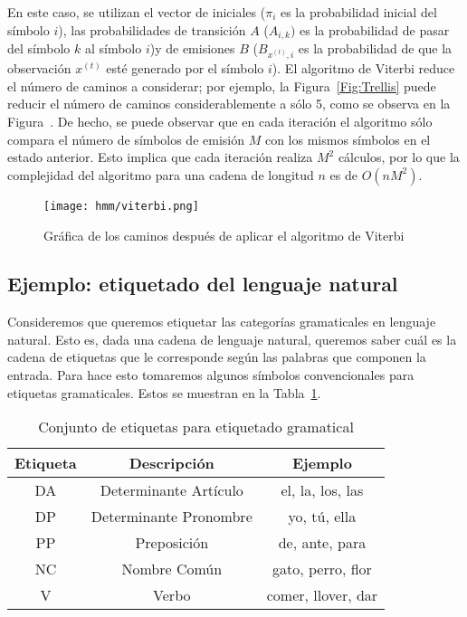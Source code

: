 En este caso, se utilizan el vector de iniciales ($\pi_i$ es la probabilidad inicial del símbolo $i$), las probabilidades de transición $A$ ($A_{i, k})$ es la probabilidad de pasar del símbolo $k$ al símbolo $i$)y de emisiones $B$ ($B_{ x^{(t)}, i}$ es la probabilidad de que la observación $x^{(t)}$ esté generado por el símbolo $i$). El algoritmo de Viterbi reduce el número de caminos a considerar; por ejemplo, la Figura~\ref{Fig:Trellis} puede reducir el número de caminos considerablemente a sólo 5, como se observa en la Figura~. De hecho, se puede observar que en cada iteración el algoritmo sólo compara el número de símbolos de emisión $M$ con los mismos símbolos en el estado anterior. Esto implica que cada iteración realiza $M^2$ cálculos, por lo que la complejidad del algoritmo para una cadena de longitud $n$ es de $O(nM^2)$. 

\begin{figure}
    \centering
    \texttt{[image: hmm/viterbi.png]}
    \caption{Gráfica de los caminos después de aplicar el algoritmo de Viterbi}
    \label{Fig:Viterbi}
\end{figure}


\subsection{Ejemplo: etiquetado del lenguaje natural}

Consideremos que queremos etiquetar las categorías gramaticales en lenguaje natural. Esto es, dada una cadena de lenguaje natural, queremos saber cuál es la cadena de etiquetas que le corresponde según las palabras que componen la entrada. Para hace esto tomaremos algunos símbolos convencionales para etiquetas gramaticales. Estos se muestran en la Tabla~\ref{tab:Tags}.

\begin{table}[]
    \centering
    \begin{tabular}{c c c} \\ \hline
        \textbf{Etiqueta} & \textbf{Descripción} & \textbf{Ejemplo}  \\ \hline
        DA & Determinante Artículo & el, la, los, las \\
        DP & Determinante Pronombre & yo, tú, ella \\
        PP & Preposición & de, ante, para \\
        NC & Nombre Común & gato, perro, flor \\
        V & Verbo & comer, llover, dar \\ \hline
    \end{tabular}
    \caption{Conjunto de etiquetas para etiquetado gramatical}
    \label{tab:Tags}
\end{table}

